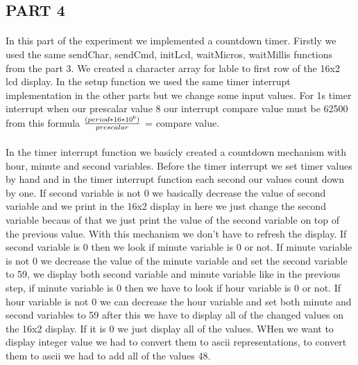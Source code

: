 \documentclass[pdftex,12pt,a4paper]{article}
\begin{document}
\begin{flushleft}
\subsection{PART 4}
\paragraph{}
In this part of the experiment we implemented a countdown timer. Firstly we used the same sendChar, sendCmd, initLcd, waitMicros, waitMillis functions from the part 3. We created a character array for lable to first row of the 16x2 lcd display. In the setup function we used the same timer interrupt implementation in the other parts but we change some input values. For 1s timer interrupt when our prescalar value 8 our interrupt compare value must be 62500 from this formula ${(period * 16*10^6)}\over{prescalar} $ = compare value. 
\paragraph{}
In the timer interrupt function we basicly created a countdown mechanism with hour, minute and second variables. Before the timer interrupt we set timer values by hand and in the timer interrupt function each second our values count down by one. If second variable is not 0 we basically decrease the value of second variable and we print in the 16x2 display in here we just change the second variable becaus of that we just print the value of the second variable on top of the previous value. With this mechanism we don't have to refresh the display. If second variable is 0 then we look if minute variable is 0 or not. If minute variable is not 0 we decrease the value of the minute variable and set the second variable to 59, we display both second variable and minute variable like in the previous step, if minute variable is 0 then we have to look if hour variable is 0 or not. If hour variable is not 0 we can decrease the hour variable and set both minute and second variables to 59 after this we have to display all of the changed values on the 16x2 display. If it is 0 we just display all of the values. WHen we want to display integer value we had to convert them to ascii representations, to convert them to ascii we had to add all of the values 48.

\end{flushleft}
\end{document}
